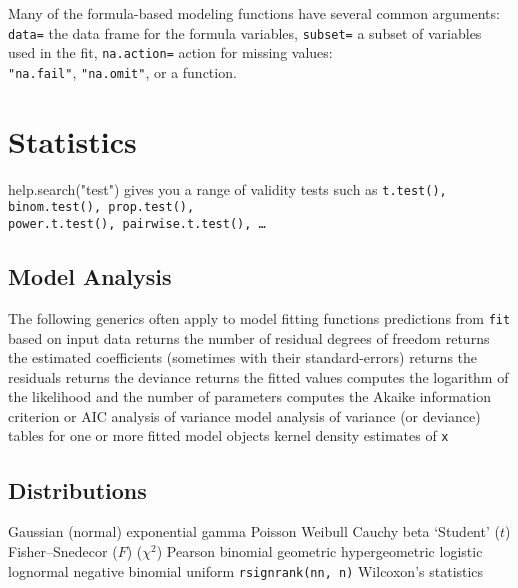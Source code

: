 Many of the formula-based modeling functions have several common
arguments: {\tt data=} the data frame for the formula variables,
{\tt subset=} a subset of variables used in the fit,
{\tt na.action=} action for missing values:\\{\tt "na.fail"}, {\tt "na.omit"}, or
a function.

\section{Statistics}{help.search("test") gives you a range of validity tests
such as {\tt t.test(), binom.test(), prop.test(),\\power.t.test(),
pairwise.t.test(), \ldots}}
\subsection{Model Analysis}	{The following generics often apply to model fitting functions}
	{predictions from {\tt fit} based on input data}
	{ returns the number of residual degrees of freedom}
	{ returns the estimated coefficients (sometimes with their standard-errors)}
	{ returns the residuals}
	{ returns the deviance}
	{ returns the fitted values}
	{ computes the logarithm of the likelihood and the number of parameters}
	{ computes the Akaike information criterion or AIC}
	{analysis of variance model}
	{analysis of variance (or deviance) tables for one or more fitted model objects}
	{kernel density estimates of {\tt x}}

\subsection{Distributions}{}
	{Gaussian (normal)}
	{exponential}
	{gamma}
	{Poisson}
	{Weibull}
	{Cauchy}
	{beta}
	{`Student' ($t$)}
	{Fisher--Snedecor ($F$)  ($\chi^2$)}
	{Pearson}
	{binomial}
	{geometric}
	{hypergeometric}
	{logistic}
	{lognormal}
	{negative binomial}
	{uniform}
	{{\tt rsignrank(nn, n)} Wilcoxon's statistics}

